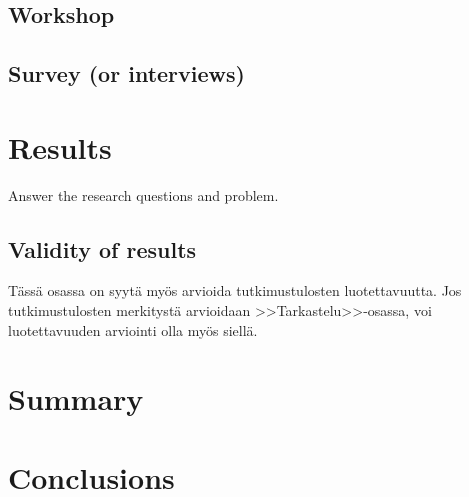 \documentclass[english, 12pt, a4paper, sci, utf8, a-1b, online]{aaltothesis}
\begin{document}
\subsection{Workshop}

\subsection{Survey (or interviews)}



\clearpage
\section{Results}

Answer the research questions and problem.

\subsection{Validity of results}

T\"ass\"a osassa on syyt\"a my\"os arvioida tutkimustulosten luotettavuutta.
Jos tutkimustulosten merkityst\"a arvioidaan >>Tarkastelu>>-osassa,
voi luotettavuuden arviointi olla my\"os siell\"a.

\clearpage
\section{Summary}

\clearpage
\section{Conclusions}

\clearpage
\thesisbibliography

\end{document}
